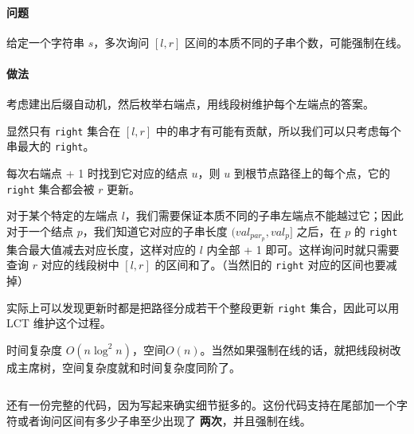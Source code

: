 \paragraph{问题} 给定一个字符串 $s$，多次询问 $[l, r]$ 区间的本质不同的子串个数，可能强制在线。

\paragraph{做法} 考虑建出后缀自动机，然后枚举右端点，用线段树维护每个左端点的答案。

显然只有 \texttt{right} 集合在 $[l, r]$ 中的串才有可能有贡献，所以我们可以只考虑每个串最大的 \texttt{right}。

每次右端点 + 1 时找到它对应的结点 $u$，则 $u$ 到根节点路径上的每个点，它的 \texttt{right} 集合都会被 $r$ 更新。

对于某个特定的左端点 $l$，我们需要保证本质不同的子串左端点不能越过它；因此对于一个结点 $p$，我们知道它对应的子串长度 $(val_{par_p}, val_p]$ 之后，在 $p$ 的 \texttt{right} 集合最大值减去对应长度，这样对应的 $l$ 内全部 + 1 即可。这样询问时就只需要查询 $r$ 对应的线段树中 $[l, r]$ 的区间和了。（当然旧的 \texttt{right} 对应的区间也要减掉）

实际上可以发现更新时都是把路径分成若干个整段更新 \texttt{right} 集合，因此可以用 LCT 维护这个过程。

时间复杂度 $O(n\log ^ 2 n)$，空间$O(n)$。当然如果强制在线的话，就把线段树改成主席树，空间复杂度就和时间复杂度同阶了。

\inputminted{cpp}{../src/string/samlct.cpp}

还有一份完整的代码，因为写起来确实细节挺多的。这份代码支持在尾部加一个字符或者询问区间有多少子串至少出现了 \textbf{两次}，并且强制在线。

\inputminted{cpp}{../src/string/samlct2.cpp}
